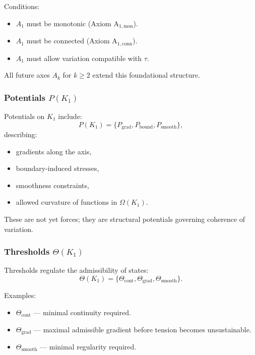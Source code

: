 Conditions:
\begin{itemize}
    \item $A_1$ must be monotonic (Axiom A$_{1,\text{mon}}$).
    \item $A_1$ must be connected (Axiom A$_{1,\text{conn}}$).
    \item $A_1$ must allow variation compatible with $\tau$.
\end{itemize}

All future axes $A_k$ for $k \ge 2$ extend this foundational structure.

\subsubsection{Potentials \texorpdfstring{$P(K_1)$}{P(K_1)}}

Potentials on $K_1$ include:
\[
P(K_1) = \{ P_{\mathrm{grad}}, P_{\mathrm{bound}}, P_{\mathrm{smooth}} \},
\]
describing:
\begin{itemize}
    \item gradients along the axis,
    \item boundary-induced stresses,
    \item smoothness constraints,
    \item allowed curvature of functions in $\Omega(K_1)$.
\end{itemize}

These are not yet forces; they are structural potentials governing
coherence of variation.

\subsubsection{Thresholds \texorpdfstring{$\Theta(K_1)$}{\Theta(K_1)}}

Thresholds regulate the admissibility of states:
\[
\Theta(K_1) = \{ \Theta_{\mathrm{cont}}, \Theta_{\mathrm{grad}},
                 \Theta_{\mathrm{smooth}} \}.
\]

Examples:
\begin{itemize}
    \item $\Theta_{\mathrm{cont}}$ — minimal continuity required.
    \item $\Theta_{\mathrm{grad}}$ — maximal admissible gradient before
          tension becomes unsustainable.
    \item $\Theta_{\mathrm{smooth}}$ — minimal regularity required.
\end{itemize}

